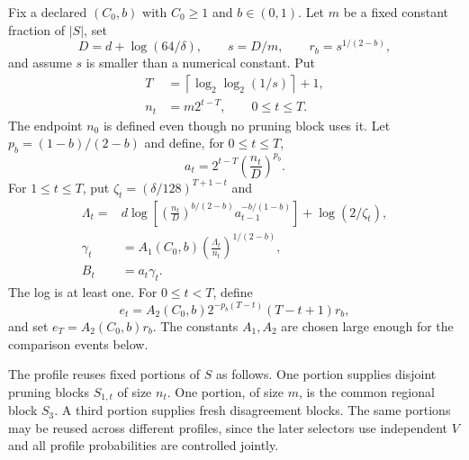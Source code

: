Fix a declared $(C_0,b)$ with $C_0\geq1$ and $b\in(0,1)$. Let $m$ be a fixed constant fraction of $|S|$, set
\[
 D=d+\log(64/\delta),\qquad s=D/m,
 \qquad r_b=s^{1/(2-b)},
\]
and assume $s$ is smaller than a numerical constant. Put
\begin{align*}
 T&=\left\lceil\log_2\log_2(1/s)\right\rceil+1,\\
 n_t&=m2^{t-T},\qquad 0\leq t\leq T.
\end{align*}
The endpoint $n_0$ is defined even though no pruning block uses it. Let $p_b=(1-b)/(2-b)$ and define, for $0\leq t\leq T$,
\begin{equation}
 a_t=2^{t-T}\left(\frac{n_t}{D}\right)^{p_b}.
 \label{eq:appendix-a}
\end{equation}
For $1\leq t\leq T$, put $\zeta_t=(\delta/128)^{T+1-t}$ and
\begin{align}
 \Lambda_t={}&d\log\!\left[
 \left(\frac{n_t}{D}\right)^{b/(2-b)}
 a_{t-1}^{-b/(1-b)}\right]
 +\log(2/\zeta_t),
 \label{eq:appendix-Lambda}\\
 \gamma_t&=A_1(C_0,b)
 \left(\frac{\Lambda_t}{n_t}\right)^{1/(2-b)},
 \label{eq:appendix-gamma}\\
 B_t&=a_t\gamma_t.
 \label{eq:appendix-B}
\end{align}
The log is at least one. For $0\leq t<T$, define
\begin{equation}
 e_t=A_2(C_0,b)2^{-p_b(T-t)}(T-t+1)r_b,
 \label{eq:appendix-e}
\end{equation}
and set $e_T=A_2(C_0,b)r_b$. The constants $A_1,A_2$ are chosen large enough for the comparison events below.

The profile reuses fixed portions of $S$ as follows. One portion supplies disjoint pruning blocks $S_{1,t}$ of size $n_t$. One portion, of size $m$, is the common regional block $S_3$. A third portion supplies fresh disagreement blocks. The same portions may be reused across different profiles, since the later selectors use independent $V$ and all profile probabilities are controlled jointly.

